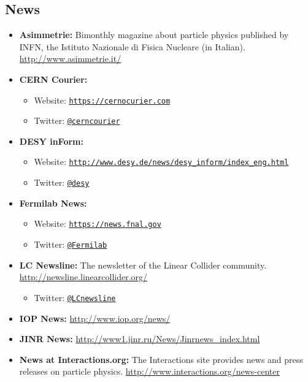 \subsection{News}\label{databases:subsec:news}

\begin{itemize}
\item
  \textbf{Asimmetrie:} Bimonthly magazine about particle physics
  published by INFN, the Istituto Nazionale di Fisica Nucleare (in
  Italian). \url{http://www.asimmetrie.it/}
\item
  \textbf{CERN Courier:}

  \begin{itemize}
  \tightlist
  \item
    Website:
    \href{https://cerncourier.com}{\texttt{https://cernocurier.com}}
  \item
    Twitter:
    \href{https://twitter.com/cerncourier}{\texttt{@cerncourier}}
  \end{itemize}
\item
  \textbf{DESY inForm:}

  \begin{itemize}
  \tightlist
  \item
    Website:
    \href{http://www.desy.de/news/desy_inform/index_eng.html}{\texttt{http://www.desy.de/news/desy\_inform/index\_eng.html}}
  \item
    Twitter: \href{https://twitter.com/desy}{\texttt{@desy}}
  \end{itemize}
\item
  \textbf{Fermilab News:}

  \begin{itemize}
  \tightlist
  \item
    Website:
    \href{https://news.fnal.gov}{\texttt{https://news.fnal.gov}}
  \item
    Twitter: \href{https://twitter.com/Fermilab}{\texttt{@Fermilab}}
  \end{itemize}
\item
  \textbf{LC Newsline:} The newsletter of the Linear Collider community.
  \url{http://newsline.linearcollider.org/}

  \begin{itemize}
  \tightlist
  \item
    Twitter: \href{https://twitter.com/LCnewsline}{\texttt{@LCnewsline}}
  \end{itemize}
\item
  \textbf{IOP News:} \url{http://www.iop.org/news/}
\item
  \textbf{JINR News:} \url{http://www1.jinr.ru/News/Jinrnews_index.html}
\item
  \textbf{News at Interactions.org:} The Interactions site provides news
  and press releases on particle physics.
  \url{http://www.interactions.org/news-center}


\end{itemize}
